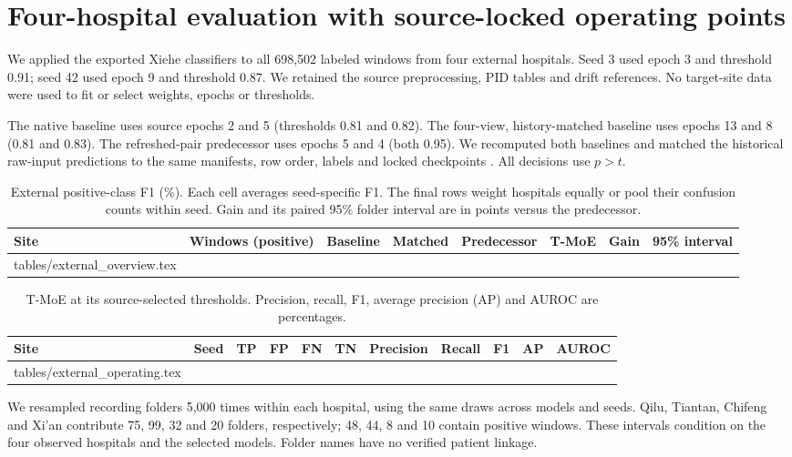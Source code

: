 \clearpage
\section{Four-hospital evaluation with source-locked operating points}\label{app:external}

We applied the exported Xiehe classifiers to all 698,502 labeled windows from four external hospitals. Seed 3 used epoch 3 and threshold 0.91; seed 42 used epoch 9 and threshold 0.87. We retained the source preprocessing, PID tables and drift references. No target-site data were used to fit or select weights, epochs or thresholds.

The native baseline uses source epochs 2 and 5 (thresholds 0.81 and 0.82). The four-view, history-matched baseline uses epochs 13 and 8 (0.81 and 0.83). The refreshed-pair predecessor uses epochs 5 and 4 (both 0.95). We recomputed both baselines and matched the historical raw-input predictions to the same manifests, row order, labels and locked checkpoints \citep{predecessor}. All decisions use $p>t$.

\begin{table}[ht]
\caption{External positive-class F1 (\%). Each cell averages seed-specific F1. The final rows weight hospitals equally or pool their confusion counts within seed. Gain and its paired 95\% folder interval are in points versus the predecessor.}\label{tab:external-overview}
\centering\small
\begin{tabular}{@{}lrrrrrrr@{}}
\toprule Site & Windows (positive) & Baseline & Matched & Predecessor & T-MoE & Gain & 95\% interval\\ \midrule
{} tables/external_overview.tex
\bottomrule
\end{tabular}
\end{table}

\begin{table}[ht]
\caption{T-MoE at its source-selected thresholds. Precision, recall, F1, average precision (AP) and AUROC are percentages.}\label{tab:external-operating}
\centering\small
\begin{tabular}{@{}lrrrrrrrrrr@{}}
\toprule Site & Seed & TP & FP & FN & TN & Precision & Recall & F1 & AP & AUROC\\ \midrule
{} tables/external_operating.tex
\bottomrule
\end{tabular}
\end{table}

We resampled recording folders 5,000 times within each hospital, using the same draws across models and seeds. Qilu, Tiantan, Chifeng and Xi'an contribute 75, 99, 32 and 20 folders, respectively; 48, 44, 8 and 10 contain positive windows. These intervals condition on the four observed hospitals and the selected models. Folder names have no verified patient linkage.

